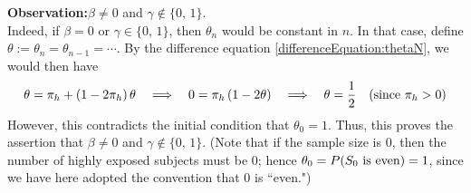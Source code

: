 \vskip 0.3cm
\noindent
\textbf{Observation:}\quad $\beta \neq 0$ and $\gamma \notin \{0,\,1\}$. \\
Indeed, if $\beta = 0$ or $\gamma \in \{0,\,1\}$,
then $\theta_{n}$ would be constant in $n$.
In that case, define $\theta := \theta_{n} = \theta_{n-1} = \cdots$.
By the difference equation \eqref{differenceEquation:thetaN}, we would then have
\begin{equation*}
\theta = \pi_{h} + (1 - 2\pi_{h})\,\theta
\quad\Longrightarrow\quad
0 = \pi_{h}\,(1  - 2\theta)
\quad\Longrightarrow\quad
\theta = \dfrac{1}{2}
\quad\textnormal{(since $\pi_{h} > 0$)}
\end{equation*}
However, this contradicts the initial condition that $\theta_{0} = 1$.
Thus, this proves the assertion that $\beta \neq 0$ and $\gamma \notin \{0,\,1\}$.
(Note that if the sample size is $0$, then the number of highly exposed subjects must be $0$;
hence $\theta_{0} = P(S_{0}\textnormal{ is even}) = 1$, since we have here adopted the
convention that $0$ is ``even.")

